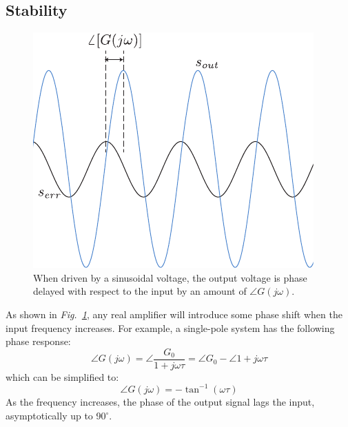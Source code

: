 \subsection{Stability}
\begin{figure}[tb]
\centering
\includegraphics[width=.85\columnwidth]{signal_phase_shift}
\caption{When driven by a sinusoidal voltage, the output voltage is phase delayed with respect to the input by an amount of $\angle G(j\omega)$.}
\label{fig:signal_phase_shift}
\end{figure}
As shown in \emph{Fig.~\ref{fig:signal_phase_shift}}, any real amplifier will introduce some phase shift when the input frequency increases. For example, a single-pole system has the following phase response:
    \begin{equation}
        \angle G(j\omega ) = \angle \frac{G_0}{{1 + j\omega \tau }} = \angle G_0 - \angle {1 + j\omega \tau }
    \end{equation}
which can be simplified to:
    \begin{equation}
        \angle G(j\omega ) =  - \tan^{-1} (\omega \tau )
    \end{equation}
As the frequency increases, the phase of the output signal lags the input, asymptotically up to 90$^\circ$.
\newpage
